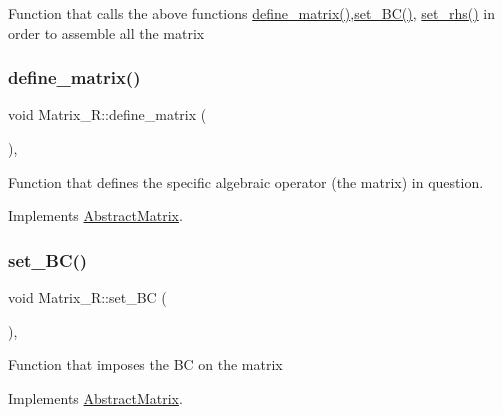 Function that calls the above functions \hyperlink{classMatrix__R_a311aefa7be3bbb741d1958e840bc4613}{define\+\_\+matrix()},\hyperlink{classMatrix__R_a33b829a44256d8d363891f3fc3d58244}{set\+\_\+\+B\+C()}, \hyperlink{classMatrix__R_a6305da2e94b8841f14061f3ad1ed9464}{set\+\_\+rhs()} in order to assemble all the matrix \mbox{\label{classMatrix__R_a311aefa7be3bbb741d1958e840bc4613}} 
\subsubsection{\texorpdfstring{define\+\_\+matrix()}{define\_matrix()}}
{\footnotesize\ttfamily void Matrix\+\_\+\+R\+::define\+\_\+matrix (\begin{DoxyParamCaption}{ }\end{DoxyParamCaption})\hspace{0.3cm}{\ttfamily [override]}, {\ttfamily [virtual]}}

Function that defines the specific algebraic operator (the matrix) in question. 

Implements \hyperlink{classAbstractMatrix_a40016da151226fbfcd444839943d8fe3}{Abstract\+Matrix}.

\mbox{\label{classMatrix__R_a33b829a44256d8d363891f3fc3d58244}} 
\subsubsection{\texorpdfstring{set\+\_\+\+B\+C()}{set\_BC()}}
{\footnotesize\ttfamily void Matrix\+\_\+\+R\+::set\+\_\+\+BC (\begin{DoxyParamCaption}{ }\end{DoxyParamCaption})\hspace{0.3cm}{\ttfamily [override]}, {\ttfamily [virtual]}}

Function that imposes the BC on the matrix 

Implements \hyperlink{classAbstractMatrix_aa0a17dacbeede4180531b115d4a9f3eb}{Abstract\+Matrix}.

\mbox{\label{classMatrix__R_ae3f3ac08d895f527362542dd3b288d62}} 
